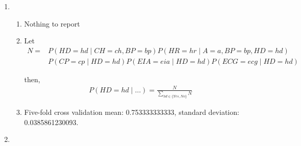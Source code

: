\documentclass[12pt]{article}
\begin{document}
\begin{enumerate}
\item %
\begin{enumerate}
\item Nothing to report

\item
Let
\begin{align*}
N = 
&P(HD=hd\mid CH=ch,BP=bp)
P(HR=hr\mid A=a,BP=bp,HD=hd)\\
&P(CP=cp\mid HD=hd)
P(EIA=eia\mid HD=hd)
P(ECG=ecg\mid HD=hd)
\end{align*}

then,
\begin{align*}
P(HD=hd\mid \ldots) = \frac{N}{\sum_{hd\in\{Yes,No\}}N}
\end{align*}

\item
Five-fold cross validation mean: 0.753333333333, standard deviation: 0.0385861230093.

\end{enumerate}

\item %

\end{enumerate}
\end{document}
